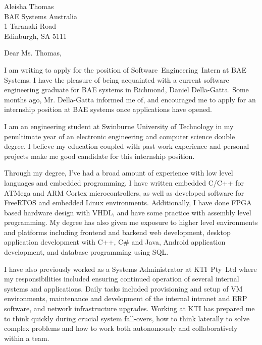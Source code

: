 \documentclass[
    backaddress=false,
    foldmarks=false,
    fromalign=right,
    fromrule,
    fromphone,
    fromemail,
    parskip=half,
    refline=nodate
]{scrlttr2}
\begin{document}
    


    \renewcommand*\raggedsignature{\raggedright}

    \begin{letter}{%
        Aleisha Thomas        \\
        BAE Systems Australia \\
        1 Taranaki Road       \\
        Edinburgh, SA 5111}
        \opening{Dear Ms. Thomas,}
        \raggedbottom
        I am writing to apply for the position of Software~Engineering~Intern at BAE Systems. I have the pleasure of being acquainted with a current software engineering graduate for BAE systems in Richmond, Daniel Della-Gatta. Some months ago, Mr. Della-Gatta informed me of, and encouraged me to apply for an internship position at BAE systems once applications have opened.

        I am an engineering student at Swinburne University of Technology in my penultimate year of an electronic engineering and computer science double degree. I believe my education coupled with past work experience and personal projects make me good candidate for this internship position.

        Through my degree, I've had a broad amount of experience with low level languages and embedded programming. I have written embedded C/C++ for ATMega and ARM Cortex microcontrollers, as well as developed software for FreeRTOS and embedded Linux environments. Additionally, I have done FPGA based hardware design with VHDL, and have some practice with assembly level programming. My degree has also given me exposure to higher level environments and platforms including frontend and backend web development, desktop application development with C++, C\# and Java, Android application development, and database programming using SQL.

        I have also previously worked as a Systems Administrator at KTI~Pty~Ltd where my responsibilities included ensuring continued operation of several internal systems and applications. Daily tasks included provisioning and setup of VM environments, maintenance and development of the internal intranet and ERP software, and network infrastructure upgrades. Working at KTI has prepared me to think quickly during crucial system fall-overs, how to think laterally to solve complex problems and how to work both autonomously and collaboratively within a team.


\end{letter}
\end{document}
